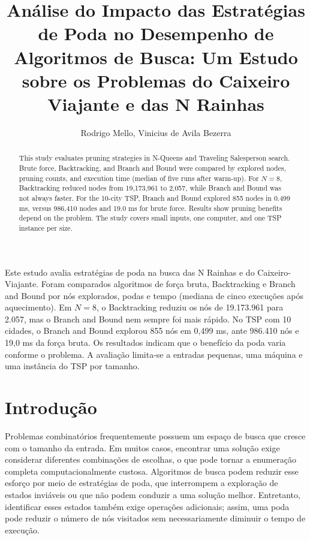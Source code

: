 \documentclass[12pt]{article}
\title{Análise do Impacto das Estratégias de Poda no Desempenho de Algoritmos de Busca: Um Estudo sobre os Problemas do Caixeiro Viajante e das N Rainhas}
\author{Rodrigo Mello\inst{1}, Vinicius de Avila Bezerra\inst{1}}
\begin{document}
\maketitle

\begin{abstract}
This study evaluates pruning strategies in N-Queens and Traveling Salesperson search. Brute force, Backtracking, and Branch and Bound were compared by explored nodes, pruning counts, and execution time (median of five runs after warm-up). For $N=8$, Backtracking reduced nodes from 19,173,961 to 2,057, while Branch and Bound was not always faster. For the 10-city TSP, Branch and Bound explored 855 nodes in 0.499 ms, versus 986,410 nodes and 19.0 ms for brute force. Results show pruning benefits depend on the problem. The study covers small inputs, one computer, and one TSP instance per size.
\end{abstract}

\begin{resumo}
Este estudo avalia estratégias de poda na busca das N Rainhas e do Caixeiro-Viajante. Foram comparados algoritmos de força bruta, Backtracking e Branch and Bound por nós explorados, podas e tempo (mediana de cinco execuções após aquecimento). Em $N=8$, o Backtracking reduziu os nós de 19.173.961 para 2.057, mas o Branch and Bound nem sempre foi mais rápido. No TSP com 10 cidades, o Branch and Bound explorou 855 nós em 0,499 ms, ante 986.410 nós e 19,0 ms da força bruta. Os resultados indicam que o benefício da poda varia conforme o problema. A avaliação limita-se a entradas pequenas, uma máquina e uma instância do TSP por tamanho.
\end{resumo}

\section{Introdução}
Problemas combinatórios frequentemente possuem um espaço de busca que cresce com o tamanho da entrada. Em muitos casos, encontrar uma solução exige considerar diferentes combinações de escolhas, o que pode tornar a enumeração completa computacionalmente custosa. Algoritmos de busca podem reduzir esse esforço por meio de estratégias de poda, que interrompem a exploração de estados inviáveis ou que não podem conduzir a uma solução melhor. Entretanto, identificar esses estados também exige operações adicionais; assim, uma poda pode reduzir o número de nós visitados sem necessariamente diminuir o tempo de execução.
\end{document}
